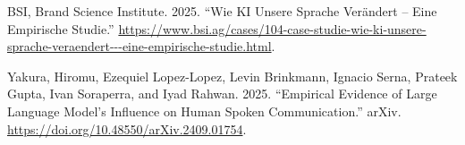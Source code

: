 \documentclass[
  letterpaper,
  DIV=11,
  numbers=noendperiod]{scrartcl}
\newlength{\cslhangindent}
\newenvironment{CSLReferences}[2] %
 {\begin{list}{}{%
  \setlength{\itemindent}{0pt}
  \setlength{\leftmargin}{0pt}
  \setlength{\parsep}{0pt}
  \ifodd #1
   \setlength{\leftmargin}{\cslhangindent}
   \setlength{\itemindent}{-1\cslhangindent}
  \fi
  \setlength{\itemsep}{#2\baselineskip}}}
 {\end{list}}
\begin{document}
\label{refs}
\begin{CSLReferences}{1}{0}
BSI, Brand Science Institute. 2025. {``Wie {KI} Unsere {Sprache}
Verändert -- {Eine} Empirische {Studie}.''}
\url{https://www.bsi.ag/cases/104-case-studie-wie-ki-unsere-sprache-veraendert---eine-empirische-studie.html}.

Yakura, Hiromu, Ezequiel Lopez-Lopez, Levin Brinkmann, Ignacio Serna,
Prateek Gupta, Ivan Soraperra, and Iyad Rahwan. 2025. {``Empirical
Evidence of {Large} {Language} {Model}'s Influence on Human Spoken
Communication.''} arXiv.
\url{https://doi.org/10.48550/arXiv.2409.01754}.

\end{CSLReferences}
\end{document}
